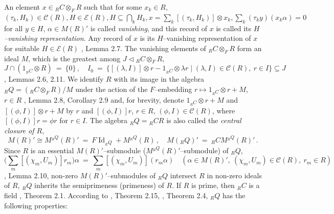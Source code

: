 \documentclass[a4paper,11pt]{article}
\DeclareMathOperator{\Id}{Id}
\begin{document}
An element ${x\in {}_R C\mathbin{\otimes_F} R}$ such that for some ${x_k\in R}$, 
${(\tau_k, H_k)\in \mathcal{C}(R), H\in \mathcal{E}(R), 
H\subseteq \bigcap\limits_k H_k, x=\sum\limits_k [(\tau_k, H_k)]\otimes x_k, 
\sum\limits_k (\tau_k y) (x_k \alpha)=0}$ for all ${y\in H}$, ${\alpha\in M(R)'}$ 
is called \emph{vanishing}, and this record of $x$ is called its 
\emph{$H$--vanishing representation}. Any record of $x$ is its $H$--vanishing 
representation of $x$ for suitable ${H\in \mathcal{E}(R)}$ \cite{BM}, 
Lemma 2.7. The vanishing elements of ${{}_R C\mathbin{\otimes_F} R}$ form 
an ideal $M$, which is the greatest among ${J\lhd {}_R C\mathbin{\otimes_F} R}$, 
\[
J\cap (1_{{}_R C}\otimes R)\ =\ \{0\}\,,\quad 
I_0\ =\ \{[(\lambda, I)]\otimes r-1_{{}_R C}\otimes \lambda r\mid 
(\lambda, I)\in \mathcal{C}(R),\ r\in I\}\subseteq J
\]
\cite{BM}, Lemmas 2.6, 2.11. We identify $R$ with its image in the 
algebra ${{}_R Q=({}_R C\mathbin{\otimes_F} R)/M}$ under the action of the 
$F$--embedding ${r\longmapsto 1_{{}_R C}\otimes r+M}$, ${r\in R}$ 
\cite{BM}, Lemma 2.8, Corollary 2.9 and, for brevity, denote  
${1_{{}_R C}\otimes r+M}$ and ${[(\phi, I)]\otimes r+M}$ by $r$ and 
${[(\phi, I)] r}$, ${r\in R}$, ${(\phi, I)\in \mathcal{C}(R)}$, where 
${[(\phi, I)] r=\phi r}$ for ${r\in I}$. The algebra ${{}_R Q={}_R C R}$ is 
also called the \emph{central closure of $R$}, 
\[
M(R)'\cong M^{{}_R Q}(R)'\ =\ F \Id_{{}_R Q}+M^{{}_R Q}(R)\,,\quad 
M({}_R Q)'\ =\ {}_R C M^{{}_R Q}(R)'\,.
\]
Since $R$ is an essential $M(R)'$--submodule 
($M^{{}_R Q}(R)'$--submodule) of ${}_R Q$, 
\[
\biggl(\sum_m [(\chi_m, U_m)] r_m\biggr) \alpha\ =\ 
\sum_m [(\chi_m, U_m)] (r_m \alpha)\quad (\alpha\in M(R)',\ 
(\chi_m, U_m)\in \mathcal{C}(R),\ r_m\in R)
\]
\cite{BM}, Lemma 2.10, non-zero $M(R)'$--submodules of ${}_R Q$ 
intersect $R$ in non-zero ideals of $R$, ${}_R Q$ inherits the 
semiprimeness (primeness) of $R$. If $R$ is prime, then ${}_R C$ is a field 
\cite{EMO}, Theorem 2.1. According to \cite{BM}, Theorem 2.15, \cite{Cab3},
Theorem 2.4, ${}_R Q$ has the following properties: 
\end{document}
